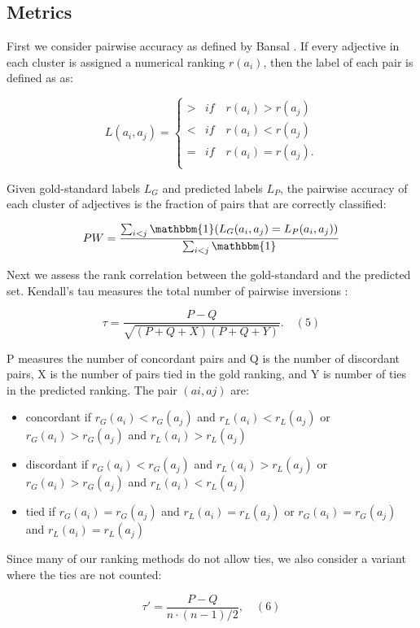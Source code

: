 \documentclass[11pt,letterpaper]{article}
\begin{document}
\subsection{Metrics}

First we consider pairwise accuracy as defined by Bansal . If every adjective in each cluster is assigned a numerical ranking $r(a_i)$, then the label of each pair is defined as as: 

\[
  L(a_i, a_j) = \begin{cases}
  > & if \quad r(a_i) > r(a_j)\\
  < & if \quad r(a_i) < r(a_j)\\
  = & if \quad r(a_i) = r(a_j).\\
  \end{cases}
\]

Given gold-standard labels $L_G$ and predicted labels $L_P$, the pairwise accuracy of each cluster of adjectives is the fraction of pairs that are correctly classified:

\[
PW = \frac{ \sum_{i < j} \mathbbm{1}( L_G(a_i,a_j) = L_P(a_i,a_j) )  }{\sum_{i<j} \mathbbm{1} }
\]

Next we assess the rank correlation between the gold-standard and the predicted set. Kendall's tau measures the total number of pairwise inversions :

\[
\tau = \frac{ P - Q }{\sqrt{  (P + Q + X)(P + Q + Y) }  }. \quad (5)
\]


P measures the number of concordant pairs and Q is the number of discordant pairs, X is the number of pairs tied in the gold ranking, and Y is number of ties in the predicted ranking. The pair $(ai,aj)$ are:

\begin{itemize}
\item concordant if $r_G(a_i) < r_G(a_j)$ and $r_L(a_i) < r_L(a_j)$ or $r_G(a_i)> r_G(a_j)$ and $r_L(a_i) > r_L(a_j)$
\item discordant if $r_G(a_i) < r_G(a_j)$ and $r_L(a_i) > r_L(a_j)$ or $r_G(a_i) > r_G(a_j)$ and $r_L(a_i) < r_L(a_j)$
\item tied if $r_G(a_i) = r_G(a_j)$ and $r_L(a_i) = r_L(a_j)$ or $r_G(a_i) = r_G(a_j)$ and $r_L(a_i) = r_L(a_j)$
\end{itemize}

Since many of our ranking methods do not allow ties, we also consider a variant where the ties are not counted:

\[
  \tau' = \frac{ P - Q }{n \cdot (n-1)/ 2 }, \quad (6)
\]
\end{document}
